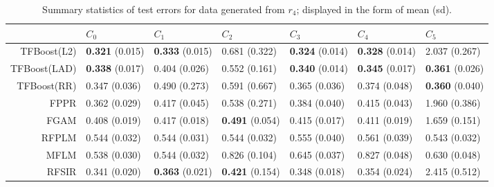 \begin{table}[H]
\centering
\footnotesize

\begin{tabular}{rllllll}
  \hline
 & $C_0$ & $C_1$ & $C_2$ & $C_3$ & $C_4$ & $C_5$ \\ 
  \hline
TFBoost(L2) & \textbf{0.321} (0.015) & \textbf{0.333} (0.015) & 0.681 (0.322) & \textbf{0.324} (0.014) & \textbf{0.328} (0.014) & 2.037 (0.267) \\ 
  TFBoost(LAD) & \textbf{0.338} (0.017) & 0.404 (0.026) & 0.552 (0.161) & \textbf{0.340} (0.014) & \textbf{0.345} (0.017) & \textbf{0.361} (0.026) \\ 
  TFBoost(RR) & 0.347 (0.036) & 0.490 (0.273) & 0.591 (0.667) & 0.365 (0.036) & 0.374 (0.048) & \textbf{0.360} (0.040) \\ 
  FPPR & 0.362 (0.029) & 0.417 (0.045) & 0.538 (0.271) & 0.384 (0.040) & 0.415 (0.043) & 1.960 (0.386) \\ 
  FGAM & 0.408 (0.019) & 0.417 (0.018) & \textbf{0.491} (0.054) & 0.415 (0.017) & 0.411 (0.019) & 1.659 (0.151) \\ 
  RFPLM & 0.544 (0.032) & 0.544 (0.031) & 0.544 (0.032) & 0.555 (0.040) & 0.561 (0.039) & 0.543 (0.032) \\ 
  MFLM & 0.538 (0.030) & 0.544 (0.032) & 0.826 (0.104) & 0.645 (0.037) & 0.827 (0.048) & 0.630 (0.048) \\ 
  RFSIR & 0.341 (0.020) & \textbf{0.363} (0.021) & \textbf{0.421} (0.154) & 0.348 (0.018) & 0.354 (0.024) & 2.415 (0.512) \\ 
   \hline
\end{tabular}
\caption{Summary statistics of test errors for data generated from $r_4$; displayed in the form of mean (sd).} 
\end{table}
